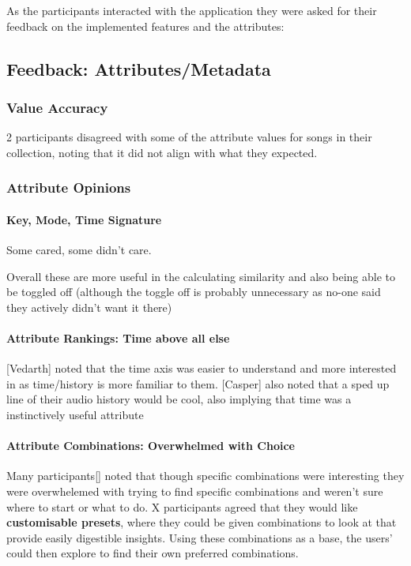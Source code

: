 As the participants interacted with the application they were asked for their feedback on the implemented features and the attributes:
\subsection{Feedback: Attributes/Metadata}

\subsubsection{Value Accuracy}
2 participants disagreed with some of the attribute values for songs in their collection, noting that it did not align with what they expected.

\subsubsection{Attribute Opinions}
\paragraph{Key, Mode, Time Signature}%
Some cared, some didn't care.

Overall these are more useful in the calculating similarity and also being able to be toggled off (although the toggle off is probably unnecessary as no-one said they actively didn't want it there)

\paragraph{Attribute Rankings: Time above all else}%
[Vedarth] noted that the time axis was easier to understand and more interested in as time/history is more familiar to them. [Casper] also noted that a sped up line of their audio history would be cool, also implying that time was a instinctively useful attribute

\paragraph{Attribute Combinations: Overwhelmed with Choice}%
Many participants[] noted that though specific combinations were interesting they were overwhelemed with trying to find specific combinations and weren't sure where to start or what to do.
X participants agreed that they would like \textbf{customisable presets}, where they could be given combinations to look at that provide easily digestible insights. Using these combinations as a base, the users' could then explore to find their own preferred combinations.

